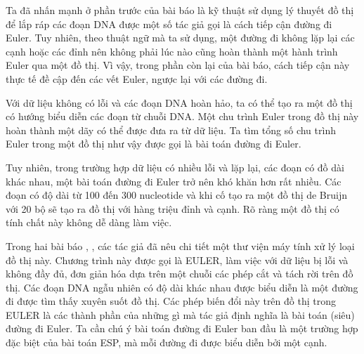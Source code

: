 \documentclass[14pt, a4paper]{article}
\numberwithin{equation}{section}
\numberwithin{figure}{section}
\numberwithin{dl}{section}
\numberwithin{md}{section}
\numberwithin{bd}{section}
\numberwithin{dn}{section}
\numberwithin{hq}{section}
\begin{document}
    Ta đã nhấn mạnh ở phần trước của bài báo là kỹ thuật sử dụng lý thuyết đồ thị để lắp ráp các đoạn DNA được một số tác giả gọi là cách tiếp cận đường đi Euler.
    Tuy nhiên, theo thuật ngữ mà ta sử dụng, một đường đi không lặp lại các cạnh hoặc các đỉnh nên không phải lúc nào cũng hoàn thành một hành trình Euler qua một đồ thị.
    Vì vậy, trong phần còn lại của bài báo, cách tiếp cận này thực tế đề cập đến các vết Euler, ngược lại với các đường đi.

    Với dữ liệu không có lỗi và các đoạn DNA hoàn hảo, ta có thể tạo ra một đồ thị có hướng biểu diễn các đoạn từ chuỗi DNA.
    Một chu trình Euler trong đồ thị này hoàn thành một dãy có thể được đưa ra từ dữ liệu.
    Ta tìm tổng số chu trình Euler trong một đồ thị như vậy được gọi là bài toán đường đi Euler.

    Tuy nhiên, trong trường hợp dữ liệu có nhiều lỗi và lặp lại, các đoạn có đồ dài khác nhau, một bài toán đường đi Euler trở nên khó khăn hơn rất nhiều.
    Các đoạn có độ dài từ 100 đến 300 nucleotide và khi cố tạo ra một đồ thị de Bruijn với 20 bộ sẽ tạo ra đồ thị với hàng triệu đỉnh và cạnh.
    Rõ ràng một đồ thị có tính chất này không dễ dàng làm việc.

    Trong hai bài báo \cite{pevzner2001eulerian}, \cite{pevzner2001new}, các tác giả đã nêu chi tiết một thư viện máy tính xử lý loại đồ thị này.
    Chương trình này được gọi là EULER, làm việc với dữ liệu bị lỗi và không đầy đủ, đơn giản hóa dựa trên một chuỗi các phép cắt và tách rời trên đồ thị.
    Các đoạn DNA ngẫu nhiên có độ dài khác nhau được biểu diễn là một đường đi được tìm thấy xuyên suốt đồ thị.
    Các phép biến đổi này trên đồ thị trong EULER là các thành phần của những gì mà tác giả định nghĩa là bài toán (siêu) đường đi Euler.
    Ta cần chú ý bài toán đường đi Euler ban đầu là một trường hợp đặc biệt của bài toán ESP, mà mỗi đường đi được biểu diễn bởi một cạnh.
\end{document}
